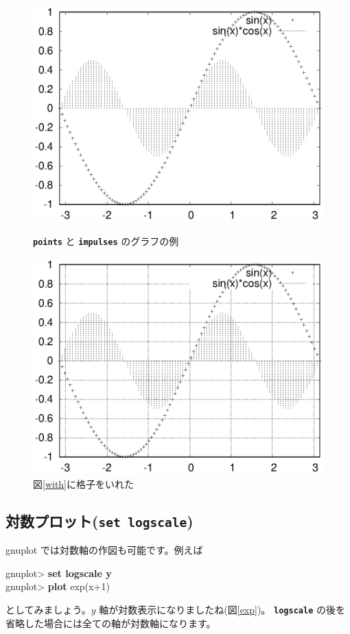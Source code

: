 \documentclass[a4j]{ujarticle} %
\newenvironment{terminal}{%
  \begin{center}
   \begin{minipage}{.8\textwidth}
    \setlength{\FrameSep}{.5\FrameSep}%
    \begin{framed}\ttfamily\small%
     \setlength\baselineskip{.85\baselineskip}%
}{%
    \end{framed}
   \end{minipage}
  \end{center}%
}
\begin{document}
\begin{figure}
\begin{minipage}[hbtp]{0.49\textwidth}
\includegraphics[width=\hsize]{with.eps}
\caption{{\tt\bf points} と {\tt\bf impulses} のグラフの例}
\label{with}
\end{minipage}
\begin{minipage}[hbtp]{0.49\textwidth}
\includegraphics[width=\hsize]{grid.eps}
\caption{図\ref{with}に格子をいれた}
\label{grid}
\end{minipage}
\end{figure}

\subsection{対数プロット({\tt\bf set logscale})}
gnuplot では対数軸の作図も可能です。例えば
\begin{terminal}
gnuplot> {\bf set logscale y} \\
gnuplot> {\bf plot} exp(x+1)
\end{terminal}
としてみましょう。$y$ 軸が対数表示になりましたね(図\ref{exp})。
{\tt\bf logscale} の後を省略した場合には全ての軸が対数軸になります。
\end{document}
